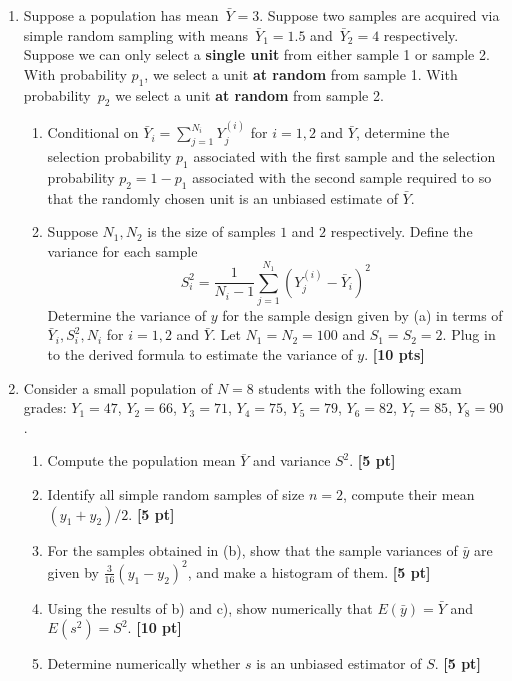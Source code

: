 \documentclass[12pt]{article}
\def\given{\, | \,}
\begin{document}
\begin{enumerate}
\begin{enumerate}
		\item Show numerically using the above example that $E (X) = E(E(X \given C) )$ and $V(X) = V(E(X \given C)) + E(V(X \given C))$ {\bf [10 pt]}

		\end{enumerate}

\item Suppose a population has mean~$\bar Y = 3$. Suppose two samples are acquired via simple random sampling with means~$\bar Y_1 = 1.5$ and~$\bar Y_2 = 4$ respectively.  Suppose we can only select a {\bf single unit} from either sample 1 or sample 2.  With probability $p_1$, we select a unit {\bf at random} from sample 1.  With probability~$p_2$ we select a unit {\bf at random} from sample 2.

	\begin{enumerate}
		\item Conditional on $\bar Y_i = \sum_{j=1}^{N_i} Y_j^{(i)}$ for $i=1,2$ and $\bar Y$, determine the selection probability $p_1$ associated with the first sample and the selection probability $p_2 = 1-p_1$ associated with the second sample required to so that the randomly chosen unit is an unbiased estimate of $\bar Y$.
		\item Suppose $N_1, N_2$ is the size of samples $1$ and $2$ respectively.  Define the variance for each sample
			$$S_i^2= \frac{1}{N_i-1} \sum_{j=1}^{N_1} (Y_j^{(i)} - \bar Y_i)^2 $$
		Determine the variance of $y$ for the sample design given by (a) in terms of $\bar Y_i, S_i^2, N_i$ for $i=1,2$ and $\bar Y$. Let $N_1 = N_2 = 100$ and $S_1 = S_2 = 2$.  Plug in to the derived formula to estimate the variance of $y$. {\bf [10 pts]}
	\end{enumerate}

\item Consider a small population of $N = 8$ students with the following exam grades: $Y_1 = 47$, $Y_2 = 66$, $Y_3 = 71$, $Y_4 = 75$, $Y_5 = 79$, $Y_6 = 82$, $Y_7 = 85$, $Y_8 = 90$.

	\begin{enumerate}
		\setlength{\itemsep}{15pt}%
		\setlength{\parskip}{15pt}%

		\item Compute the population mean $\bar Y$ and variance $S^2$. {\bf [5 pt]}
		\item Identify all simple random samples of size $n=2$, compute their mean $(y_1 + y_2)/2$. {\bf [5 pt]}
		\item For the samples obtained in (b), show that the sample variances of $\bar y$ are given by $\frac{3}{16} (y_1 - y_2)^2$, and make a histogram of them. {\bf [5 pt]}
		\item Using the results of b) and c), show numerically that $E(\bar y) = \bar Y$ and $E (s^2) = S^2$. {\bf [10 pt]}
		\item Determine numerically whether $s$ is an unbiased estimator of $S$. {\bf [5 pt]}
	\end{enumerate}


\end{enumerate}
\end{document}
